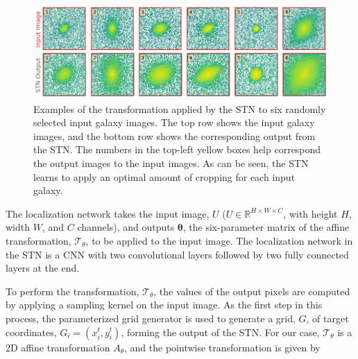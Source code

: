 \begin{figure}[htb]
    \centering
    \includegraphics[width
    =\textwidth]{stn_examples.png}
    \caption{Examples of the transformation applied by the STN to six randomly selected input galaxy images. The top row shows the input galaxy images, and the bottom row shows the corresponding output from the STN. The numbers in the top-left yellow boxes help correspond the output images to the input images. As can be seen, the STN learns to apply an optimal amount of cropping for each input galaxy.}
    \label{fig_c2:stn_examples}
\end{figure}

The localization network takes the input image, $U$ ($U \in \mathbb{R}^{H \times W \times C}$, with height $H$, width $W$, and $C$ channels), and outputs $\boldsymbol{\theta}$, the six-parameter matrix of the affine transformation, $\mathcal{T}_\theta$, to be applied to the input image.
The localization network in the STN is a CNN with two convolutional layers followed by two fully connected layers at the end. 


To perform the transformation, $\mathcal{T}_\theta$, the values of the output pixels are computed by applying a sampling kernel on the input image. As the first step in this process, the parameterized grid generator is used to generate a grid, $G$, of target coordinates, $ G_i =  \left( x_i^t, y_i^t \right) $, forming the output of the STN. For our case, $\mathcal{T}_\theta$ is a 2D affine transformation $A_{\theta}$, and the pointwise transformation is given by

